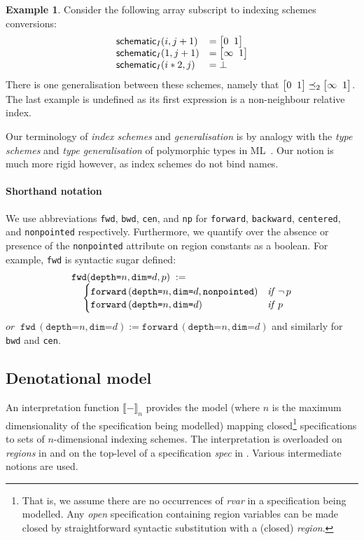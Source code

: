 \documentclass[10pt,preprint,numbers]{sigplanconf}
\newcounter{block}
\theoremstyle{definition}
\newtheorem{example}[block]{Example}
\newcommand{\interp}[1]{\llbracket{#1}\rrbracket}
\newcommand{\term}[1]{\texttt{#1}}
\newcommand{\stenFwd}[3]{\term{forward} \, (\term{depth=}#1,
  \term{dim=}#2{#3})}
\newcommand{\irrefl}{\texttt{nonpointed}}
\newcommand{\stenFwdS}[2]{\term{fwd} \, (\term{depth=}#1,
  \term{dim=}#2)}
\newcommand{\irreflS}{\texttt{np}}
\newcommand{\stenFwdSR}[3]{\term{fwd} (\term{depth=}#1,
  \term{dim=}#2, #3)}
\newcommand{\vtwoh}[2]{\setlength{\arraycolsep}{0em}
\left[\begin{array}{cc}#1 \; & \; #2\end{array}\right]}
\begin{document}
\begin{example}
Consider the following array subscript to indexing schemes
conversions:
%
\begin{align*}
\begin{array}{ll}
\schemeN{(i, j+1)} & =\vtwoh{0}{1} \\
\schemeN{(1, j+1)} & = \vtwoh{\infty}{1} \\
\schemeN{(i*2, j)} & = \bot
\end{array}
\end{align*}
There is one generalisation between these
schemes, namely that $\vtwoh{0}{1} \preceq_2 \vtwoh{\infty}{1}$.
The last example is undefined as its first expression is a
non-neighbour relative index.
\end{example}

Our terminology of \emph{index schemes} and
\emph{generalisation} is by analogy
with the \emph{type schemes} and \emph{type generalisation} of
polymorphic types in ML~\cite{milner1978theory}. Our notion is
much more rigid however, as index schemes do not bind names.

\paragraph{Shorthand notation}

We use abbreviations
 \term{fwd}, \term{bwd}, \term{cen}, and \irreflS{}
for \term{forward}, \term{backward},
\term{centered}, and \irrefl{} respectively. Furthermore, 
we quantify over the absence or presence of the \irrefl{}
attribute on region constants as a boolean. For example,
\term{fwd} is syntactic sugar defined:
\begin{align*}
\hspace{-0.5em}
& \stenFwdSR{n}{d}{p}
\; := \; \\[-0.4em]
& \quad \begin{cases}
\stenFwd{n}{d}{, \irrefl} & \textit{if} \;\, \neg \, p \\[-0.1em]
\stenFwd{n}{d}{}  & \textit{if} \;\,  p
\end{cases}
\end{align*}
%
$\textit{or} \;\; \stenFwdS{n}{d} := \stenFwd{n}{d}{}$
and similarly for \term{bwd} and \term{cen}.


\subsection{Denotational model}

An interpretation function $\interp{-}_n$ provides the model 
(where $n$ is the maximum dimensionality of the specification being
modelled) mapping closed\footnote{That is, we assume there are no
  occurrences of \textit{rvar} in a specification being modelled.  Any
  \emph{open} specification containing region variables can be made
  closed by straightforward syntactic substitution with a (closed)
  \textit{region}.} specifications to sets of
$n$-dimensional indexing schemes. The interpretation is overloaded on
\emph{regions} in  and on the top-level
of a specification \textit{spec} in .
Various intermediate notions are used.
\end{document}
